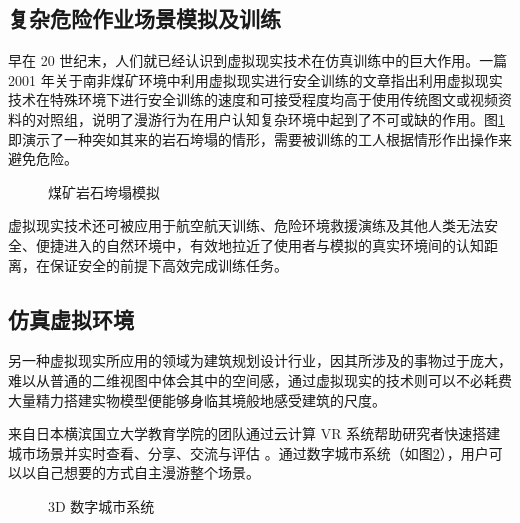\subsection{复杂危险作业场景模拟及训练}

早在 20 世纪末，人们就已经认识到虚拟现实技术在仿真训练中的巨大作用。一篇 2001 年关于南非煤矿环境中利用虚拟现实进行安全训练的文章指出利用虚拟现实技术在特殊环境下进行安全训练的速度和可接受程度均高于使用传统图文或视频资料的对照组，说明了漫游行为在用户认知复杂环境中起到了不可或缺的作用。图\ref{fig:mine}即演示了一种突如其来的岩石垮塌的情形，需要被训练的工人根据情形作出操作来避免危险。

\begin{figure}[htp]
\centering
{}
\caption{煤矿岩石垮塌模拟}
\label{fig:mine}
\end{figure}

虚拟现实技术还可被应用于航空航天训练、危险环境救援演练及其他人类无法安全、便捷进入的自然环境中，有效地拉近了使用者与模拟的真实环境间的认知距离，在保证安全的前提下高效完成训练任务。

\subsection{仿真虚拟环境}

另一种虚拟现实所应用的领域为建筑规划设计行业，因其所涉及的事物过于庞大，难以从普通的二维视图中体会其中的空间感，通过虚拟现实的技术则可以不必耗费大量精力搭建实物模型便能够身临其境般地感受建筑的尺度。

来自日本横滨国立大学教育学院的团队通过云计算 VR 系统帮助研究者快速搭建城市场景并实时查看、分享、交流与评估
。通过数字城市系统（如图\ref{fig:urban}），用户可以以自己想要的方式自主漫游整个场景。

\begin{figure}[htp]
\centering
{}
\caption{3D 数字城市系统}
\label{fig:urban}
\end{figure}

